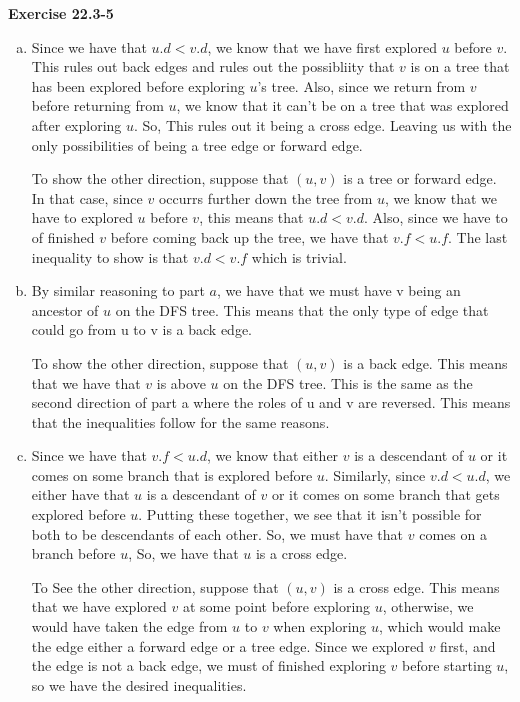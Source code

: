 \documentclass{article}
\begin{document}
\noindent\textbf{Exercise 22.3-5}\\
\begin{enumerate}[a.]
\item
Since we have that $u.d < v.d$, we know that we have first explored $u$ before $v$. This rules out back edges and rules out the possibliity that $v$ is on a tree that has been explored before exploring $u$'s tree. Also, since we return from $v$ before returning from $u$, we know that it can't be on a tree that was explored after exploring $u$. So, This rules out it being a cross edge. Leaving us with the only possibilities of being a tree edge or forward edge.

To show the other direction, suppose that $(u,v)$ is a tree or forward edge. In that case, since $v$ occurrs further down the tree from $u$, we know that we have to explored $u$ before $v$, this means that $u.d< v.d$. Also, since we have to of finished $v$ before coming back up the tree, we have that $v.f<u.f$. The last inequality to show is that $v.d < v.f$ which is trivial.
\item
By similar reasoning to part $a$, we have that we must have v being an ancestor of $u$ on the DFS tree. This means that the only type of edge that could go from u to v is a back edge.

To show the other direction, suppose that $(u,v)$ is a back edge. This means that we have that $v$ is above $u$ on the DFS tree. This is the same as the second direction of part a where the roles of u and v are reversed. This means that the inequalities follow for the same reasons.


\item
Since we have that $v.f < u.d$, we know that either $v$ is a descendant of $u$ or it comes on some branch that is explored before $u$. Similarly, since $v.d < u.d$, we either have that $u$ is a descendant of $v$ or it comes on some branch that gets explored before $u$. Putting these together, we see that it isn't possible for both to be descendants of each other. So, we must have that $v$ comes on a branch before $u$, So, we have that $u$ is a cross edge.

To See the other direction, suppose that $(u,v)$ is a cross edge. This means that we have explored $v$ at some point before exploring $u$, otherwise, we would have taken the edge from $u$ to $v$ when exploring $u$, which would make the edge either a forward edge or a tree edge. Since we explored $v$ first, and the edge is not a back edge, we must of finished exploring $v$ before starting $u$, so we have the desired inequalities.


\end{enumerate}
\end{document}
